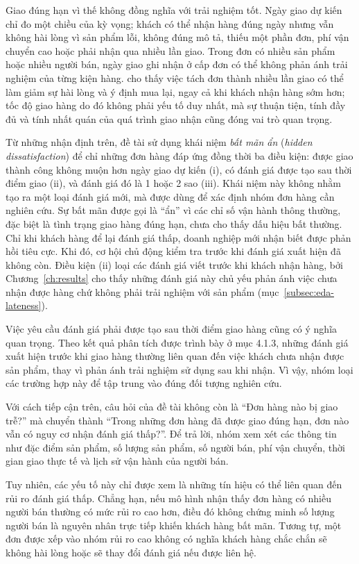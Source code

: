 \documentclass[12pt,a4paper]{report}
\begin{document}
Giao đúng hạn vì thế không đồng nghĩa với trải nghiệm tốt. Ngày giao dự kiến chỉ đo một chiều của kỳ vọng; khách có thể nhận hàng đúng ngày nhưng vẫn không hài lòng vì sản phẩm lỗi, không đúng mô tả, thiếu một phần đơn, phí vận chuyển cao hoặc phải nhận qua nhiều lần giao. Trong đơn có nhiều sản phẩm hoặc nhiều người bán, ngày giao ghi nhận ở cấp đơn có thể không phản ánh trải nghiệm của từng kiện hàng. \textcite{brylla2022} cho thấy việc tách đơn thành nhiều lần giao có thể làm giảm sự hài lòng và ý định mua lại, ngay cả khi khách nhận hàng sớm hơn; tốc độ giao hàng do đó không phải yếu tố duy nhất, mà sự thuận tiện, tính đầy đủ và tính nhất quán của quá trình giao nhận cũng đóng vai trò quan trọng.

Từ những nhận định trên, đề tài sử dụng khái niệm \emph{bất mãn ẩn} (\emph{hidden dissatisfaction}) để chỉ những đơn hàng đáp ứng đồng thời ba điều kiện: được giao thành công không muộn hơn ngày giao dự kiến (i), có đánh giá được tạo sau thời điểm giao (ii), và đánh giá đó là 1 hoặc 2 sao (iii). Khái niệm này không nhằm tạo ra một loại đánh giá mới, mà được dùng để xác định nhóm đơn hàng cần nghiên cứu. Sự bất mãn được gọi là “ẩn” vì các chỉ số vận hành thông thường, đặc biệt là tình trạng giao hàng đúng hạn, chưa cho thấy dấu hiệu bất thường. Chỉ khi khách hàng để lại đánh giá thấp, doanh nghiệp mới nhận biết được phản hồi tiêu cực. Khi đó, cơ hội chủ động kiểm tra trước khi đánh giá xuất hiện đã không còn. Điều kiện (ii) loại các đánh giá viết trước khi khách nhận hàng, bởi Chương~\ref{ch:results} cho thấy những đánh giá này chủ yếu phản ánh việc chưa nhận được hàng chứ không phải trải nghiệm với sản phẩm (mục~\ref{subsec:eda-lateness}).

Việc yêu cầu đánh giá phải được tạo sau thời điểm giao hàng cũng có ý nghĩa quan trọng. Theo kết quả phân tích được trình bày ở mục 4.1.3, những đánh giá xuất hiện trước khi giao hàng thường liên quan đến việc khách chưa nhận được sản phẩm, thay vì phản ánh trải nghiệm sử dụng sau khi nhận. Vì vậy, nhóm loại các trường hợp này để tập trung vào đúng đối tượng nghiên cứu.

Với cách tiếp cận trên, câu hỏi của đề tài không còn là “Đơn hàng nào bị giao trễ?” mà chuyển thành “Trong những đơn hàng đã được giao đúng hạn, đơn nào vẫn có nguy cơ nhận đánh giá thấp?”. Để trả lời, nhóm xem xét các thông tin như đặc điểm sản phẩm, số lượng sản phẩm, số người bán, phí vận chuyển, thời gian giao thực tế và lịch sử vận hành của người bán.

Tuy nhiên, các yếu tố này chỉ được xem là những tín hiệu có thể liên quan đến rủi ro đánh giá thấp. Chẳng hạn, nếu mô hình nhận thấy đơn hàng có nhiều người bán thường có mức rủi ro cao hơn, điều đó không chứng minh số lượng người bán là nguyên nhân trực tiếp khiến khách hàng bất mãn. Tương tự, một đơn được xếp vào nhóm rủi ro cao không có nghĩa khách hàng chắc chắn sẽ không hài lòng hoặc sẽ thay đổi đánh giá nếu được liên hệ.
\end{document}
